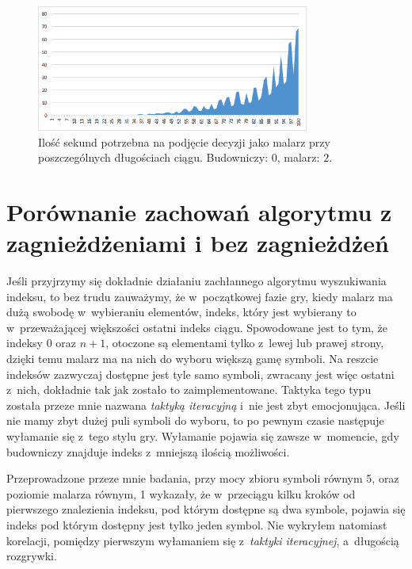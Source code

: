 \documentclass[document]{xmgr}
\begin{document}
\begin{figure}[tbh]
    \centering
    \includegraphics[width = 0.8\textwidth]{images/timePainter2Builder0}
    \caption{Ilość sekund potrzebna na podjęcie decyzji jako malarz przy poszczególnych długościach ciągu. Budowniczy: $0$, malarz: $2$.}
    \label{fig:painter2builder0}
\end{figure}


\section{Porównanie zachowań algorytmu z zagnieżdżeniami i bez zagnieżdżeń}
Jeśli przyjrzymy się dokładnie działaniu zachłannego algorytmu wyszukiwania indeksu, to bez trudu zauważymy, że w~początkowej fazie gry, kiedy malarz ma dużą swobodę w~wybieraniu elementów, indeks, który jest wybierany to w~przeważającej większości ostatni indeks ciągu. Spowodowane jest to tym, że indeksy $0$ oraz $n+1$, otoczone są elementami tylko z~lewej lub prawej strony, dzięki temu malarz ma na nich do wyboru większą gamę symboli. Na reszcie indeksów zazwyczaj dostępne jest tyle samo symboli, zwracany jest więc ostatni z~nich, dokładnie tak jak zostało to zaimplementowane. Taktyka tego typu została przeze mnie nazwana \emph{taktyką iteracyjną} i~nie jest zbyt emocjonująca. Jeśli nie mamy zbyt dużej puli symboli do wyboru, to po pewnym czasie następuje wyłamanie się z~tego stylu gry. Wyłamanie pojawia się zawsze w~momencie, gdy budowniczy znajduje indeks z~mniejszą ilością możliwości. 

Przeprowadzone przeze mnie badania, przy mocy zbioru symboli równym 5, oraz poziomie malarza równym, 1 wykazały, że w~przeciągu kilku kroków od pierwszego znalezienia indeksu, pod którym dostępne są dwa symbole, pojawia się indeks pod którym dostępny jest tylko jeden symbol. Nie wykryłem natomiast korelacji, pomiędzy pierwszym wyłamaniem się z~\emph{taktyki iteracyjnej}, a~długością rozgrywki. 
 
\end{document}
